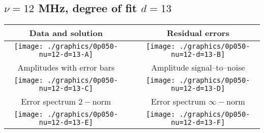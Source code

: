 

% 

\clearpage{}
\break{}

\subsection{$\nu = 12$ MHz, degree of fit $d = 13$}

\begin{table}[h]
    \begin{center}
        \begin{tabular}{ccc}
            Data and solution & \quad & Residual errors \\\hline
            \texttt{[image: ./graphics/0p050-nu=12-d=13-A]} &&
            \texttt{[image: ./graphics/0p050-nu=12-d=13-B]} \\[15pt]
            Amplitudes with error bars && Amplitude signal--to--noise \\\hline
            \texttt{[image: ./graphics/0p050-nu=12-d=13-C]} &&
            \texttt{[image: ./graphics/0p050-nu=12-d=13-D]} \\[15pt]
            Error spectrum $2-$norm && Error spectrum $\infty-$norm \\\hline
            \texttt{[image: ./graphics/0p050-nu=12-d=13-E]} &&
            \texttt{[image: ./graphics/0p050-nu=12-d=13-F]} \\[15pt]
        \end{tabular}
    \end{center}
\label{fig:elev=50, nu=12}
\end{table}



\endinput

